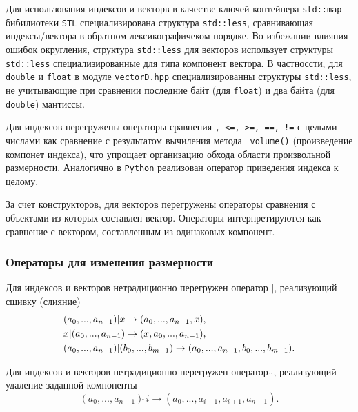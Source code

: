 Для использования индексов и векторв в качестве ключей контейнера \verb'std::map' бибилиотеки \verb'STL' специализирована структура
\verb'std::less', сравнивающая индексы/вектора в обратном лексикографичеком порядке. Во избежании влияния ошибок округления,
структура \verb'std::less' для векторов использует структуры \verb'std::less' специализированные для типа компонент вектора. 
В частноссти, для  \verb'double' и \verb'float' в модуле \verb'vectorD.hpp' специализированны  структуры \verb'std::less',
не учитывающие при сравнении последние байт (для \verb'float') и два байта (для \verb'double') мантиссы.

Для индексов перегружены операторы сравнения {\tt <, >, <=, >=, ==,
  !=} с целыми числами как сравнение с результатом вычиления метода {\tt
  volume()} (произведение компонет индекса), что упрощает организацию обхода
области произвольной размерности. Аналогично в {\tt Python} реализован
оператор приведения индекса к целому.

За счет конструкторов, для векторов перегружены операторы сравнения с объектами из которых составлен вектор. Операторы интерпретируются как
сравнение с вектором, составленным из одинаковых компонент.


\subsubsection{Операторы для изменения размерности}
Для индексов и векторов нетрадиционно перегружен оператор $|$,
реализующий сшивку (слияние)
\begin{align}
&(a_0,...,a_{n-1})|x \to (a_0,...,a_{n-1},x), \notag\\
&x|(a_0,...,a_{n-1}) \to (x,a_0,...,a_{n-1}), \notag\\
&(a_0,...,a_{n-1})|(b_0,...,b_{m-1}) \to (a_0,...,a_{n-1},b_0,...,b_{m-1}). \notag
\end{align}

Для индексов и векторов нетрадиционно перегружен оператор $\widehat{~}$,
реализующий удаление заданной компоненты
$$(a_0,...,a_{n-1})\widehat{~}i \to (a_0,...,a_{i-1},a_{i+1},a_{n-1}). $$ 



